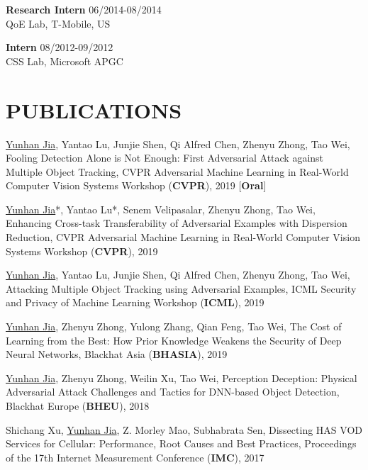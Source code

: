 \documentclass[margin]{res}
\begin{document}
\begin{resume}
\textbf{Research Intern} \hfill 06/2014-08/2014 \\
QoE Lab, T-Mobile, US

\textbf{Intern} \hfill 08/2012-09/2012 \\
CSS Lab, Microsoft APGC


\section{PUBLICATIONS}
\underline{Yunhan Jia}, Yantao Lu, Junjie Shen, Qi Alfred Chen, Zhenyu Zhong, Tao Wei,
Fooling Detection Alone is Not Enough: First Adversarial Attack against Multiple Object Tracking, CVPR Adversarial Machine Learning in Real-World Computer Vision Systems Workshop (\textbf{CVPR}), 2019 [\textbf{Oral}] \href{https://arxiv.org/pdf/1905.11026.pdf}{\color{blue}{[PDF]}}

\underline{Yunhan Jia}*, Yantao Lu*, Senem Velipasalar, Zhenyu Zhong, Tao Wei, Enhancing Cross-task Transferability of Adversarial Examples with Dispersion Reduction, CVPR Adversarial Machine Learning in Real-World Computer Vision Systems Workshop (\textbf{CVPR}), 2019 \href{https://arxiv.org/pdf/1905.03333.pdf}{\color{blue}{[PDF]}}


\underline{Yunhan Jia}, Yantao Lu, Junjie Shen, Qi Alfred Chen, Zhenyu Zhong, Tao Wei,
Attacking Multiple Object Tracking using Adversarial Examples, ICML Security and Privacy of Machine Learning Workshop (\textbf{ICML}), 2019 \href{https://github.com/jiayunhan/jiayunhan.github.io/blob/master/material/fooling_spml19.pdf}{\color{blue}{[Poster]}}

\underline{Yunhan Jia}, Zhenyu Zhong, Yulong Zhang, Qian Feng, Tao Wei,
The Cost of Learning from the Best: How Prior Knowledge Weakens the Security of Deep Neural Networks, Blackhat Asia (\textbf{BHASIA}), 2019 \href{http://i.blackhat.com/asia-19/Thu-March-28/bh-asia-Jia-the-Cost-of-Learning-From-the-Best-How-Prior-Knowledge-Weakens-the-Security-of-Deep-Neural-Networks.pdf}{\color{blue}{[Slides]}}

\underline{Yunhan Jia}, Zhenyu Zhong, Weilin Xu, Tao Wei,
Perception Deception: Physical Adversarial Attack Challenges and Tactics for DNN-based Object Detection, Blackhat Europe (\textbf{BHEU}), 2018 \href{http://i.blackhat.com/eu-18/Thu-Dec-6/eu-18-Zhong-Perception-Deception-Physical-Adversarial-Attack-Challenges-and-Tactics-for-DNN-Based-Object-Detection.pdf}{\color{blue}{[Slides]}}

Shichang Xu, \underline{Yunhan Jia}, Z. Morley Mao, Subhabrata Sen,
Dissecting HAS VOD Services for Cellular: Performance, Root Causes and Best Practices, Proceedings of the 17th Internet Measurement Conference (\textbf{IMC}), 2017 \href{https://conferences.sigcomm.org/imc/2017/papers/imc17-final111.pdf}{\color{blue}{[PDF]}}


\end{resume}
\end{document}
